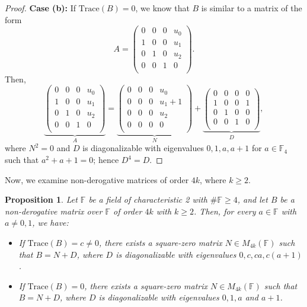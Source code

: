 \documentclass{amsart}
\def\FF{\mathbb{F}}
\newtheorem{proposition}[theorem]{Proposition}
\theoremstyle{definition}
\theoremstyle{remark}
\numberwithin{equation}{section}
\begin{document}
\begin{proof}
\medskip

{\bf Case (b):} If $\text{Trace}(B)=0$, we know that $B$ is similar to a matrix of the form
$$
A=\left(
    \begin{array}{cccc}
      0 & 0 & 0 & u_0 \\
      1 & 0 & 0 & u_1 \\
      0 & 1 & 0 & u_2 \\
      0 & 0 & 1 & 0 \\
    \end{array}
  \right).
$$ Then,
$$
\underbrace{\left(
    \begin{array}{cccc}
      0 & 0 & 0 & u_0 \\
      1 & 0 & 0 & u_1 \\
      0 & 1 & 0 & u_2 \\
      0 & 0 & 1 & 0 \\
    \end{array}
  \right)}_A=\underbrace{\left(
    \begin{array}{cccc}
      0 & 0 & 0 & u_0 \\
      0 & 0 & 0 & u_1+1 \\
      0 & 0 & 0 & u_2 \\
      0 & 0 & 0 & 0 \\
    \end{array}
  \right)}_N+\underbrace{\left(
    \begin{array}{cccc}
      0 & 0 & 0 & 0 \\
      1 & 0 & 0 & 1 \\
      0 & 1 & 0 & 0 \\
      0 & 0 & 1 & 0 \\
    \end{array}
  \right)}_D,
$$
where $N^2=0$ and $D$ is diagonalizable with eigenvalues $0,1,a,a+1$ for $a\in \FF_4$ such that $a^2+a+1=0$; hence $D^4=D$.
\end{proof}

Now, we examine non-derogative matrices of order $4k$, where $k\ge 2$.

\begin{proposition}\label{4k}
Let $\FF$ be a field of characteristic 2 with $\#\FF\ge4$, and let $B$ be a non-derogative matrix over $\FF$ of order $4k$ with $k\ge 2$. Then, for every $a\in \FF$ with $a\ne 0,1$, we have:
  \begin{itemize}
\item[(a)] If $\text{Trace}(B)=c\ne 0$, there exists a square-zero matrix $N\in {M}_{4k}(\FF)$ such that $B=N+D$, where $D$ is diagonalizable with eigenvalues $0, c, ca,c(a+1)$.
\item[(b)] If $\text{Trace}(B)=0$, there exists a square-zero matrix $N\in {M}_{4k}(\FF)$ such that $B=N+D$, where $D$ is diagonalizable with eigenvalues $0,1,a$ and $a+1$.
  \end{itemize}
\end{proposition}
\end{document}
